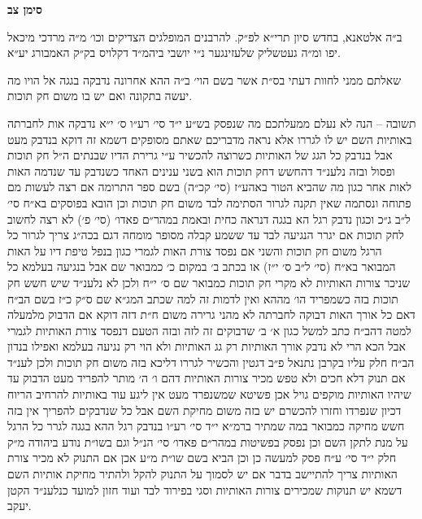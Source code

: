 \documentclass[12pt, openany]{book}
\newcommand{\chapname}{}
\newcommand{\newchap}[1]{
	\addcontentsline{toc}{chapter}{#1}
	\renewcommand{\chapname}{#1}
		\begin{center}
			\textbf{%
\fontsize{16pt}{16pt}\selectfont
				#1}
		\end{center}
}
\begin{document}
\newchap{סימן צב}
\begin{multicols}{2}
ב״ה אלטאנא, בחדש סיון תרי״א לפ״ק. להרבנים המופלגים הצדיקים וכו׳ מ״ה מרדכי מיכאל יפו ומ״ה געטשליק שלעזינגער נ״י יושבי ביהמ״ד דקלויס בק״ק האמבורג יע״א.\\\vspace{0pt}

שאלתם ממני לחוות דעתי בס״ת אשר בשם הוי׳ ב״ה ההא אחרונה נדבקה בגגה אל הויו מה יעשה בתקונה ואם יש בו משום חק תוכות.\\\vspace{0pt}

תשובה – הנה לא נעלם ממעלתכם מה שנפסק בש״ע י״ד סי׳ רע״ו ס׳ י״א נדבקה אות לחברתה באותיות השם יש לו לגררו אלא נראה מדבריכם שאתם מסופקים דשמא זה דוקא בנדבק מעט אבל בנדבק כל הגג של האותיות כשרוצה להכשיר ע״י גרירת הדיו שבנתים ה״ל חק תוכות ופסול ובזה נלענ״ד דהחשש דחק תוכות הוא בשני ענינים האחד כשנדבק עד שנדמה האות לאות אחר כגון מה שהביא הטור באהע״ז (סי׳ קכ״ה) בשם ספר התרומה אם רצה לעשות מם פתוחה ונסתמה שאין תקנה לגרור הסתימה לבד משום חק תוכות וכן הובא בפוסקים בא״ח סי׳ ל״ב ג״כ וכגון נדבק רגל הא בגגה דנראה כחית ובאמת במהר״ם פאדו׳ (סי׳ פ׳) לא רצה לחשוב לחק תוכות אם יגרר הנגיעה לבד עד ששמע קבלה מסופר מומחה דגם בכה״ג צריך לגרור כל הרגל משום חק תוכות והשני אם נפסד צורת האות לגמרי כגון בנפל טיפת דיו על האות המבואר בא״ח (סי׳ ל״ב ס׳ י״ז) או בכתב ב׳ במקום כ׳ כמבואר שם אבל בנגיעה בעלמא כל שניכר צורות האותיות לא מקרי חק תוכות כמבואר שם ס׳ י״ח ולכן לא נלענ״ד שיש חשש חק תוכות בזה כשמפריד הו׳ מההא ואין לדמות זה למה שכתב המג״א שם ס״ק כ״ז בשם הב״ח דאם כל אורך האות דבוקה לחברתה לא מהני גרירה משום ח״ת דזה דוקא אם הדבוק מלמעלה למטה דהב״ח כתב למשל כגון א׳ ב׳ שדבוקים זה לזה ובזה הטעם דנפסד צורת האותיות לגמרי אבל הכא הרי לא נדבק אורך האותיות רק גג האותיות ולא הוי רק נגיעה בעלמא ואפילו בנדון הב״ח חלק עליו בקרבן נתנאל פ״ב דגטין והכשיר לגררו דליכא בזה משום חק תוכות ולכן לענ״ד אם תנוק דלא חכים ולא טפש מכיר צורות האותיות דהם ו׳ ה׳ מותר להפריד מעט הדבוק עד שיהיו האותיות מוקפים גויל אכן פשיטא שמשנפרד מעט אין ליגע עוד באותיות להרחיב הריוח דכיון שנפרדו וחזרו להכשרם יש בזה משום מחיקת השם אבל כל שנדבקים להפריך אין בזה חשש מחיקה כמבואר במה שמתיר ברמ״א י״ד סי׳ רע״ו בנדבק רגל ההא בגגה לגרר כל הרגל על מנת לתקן השם וכן נפסק בפשיטות במהר״ם פאדו׳ סי׳ הנ״ל וגם בשו״ת נודע ביהודה מ״ק חלק י״ד סי׳ ע״ח פסק למעשה כן וכן הביא בשם שו״ת מ״ע אכן אם התנוק לא מכיר צורת האותיות צריך להתיישב בדבר אם יש לסמוך על התנוק להקל ולהתיר מחיקת אותיות השם דשמא יש תנוקות שמכירים צורות האותיות וסגי בפירוד לבד ועוד חזון למועד כנלענ״ד הקטן יעקב.\\\vspace{0pt}

\end{multicols}\newpage
\end{document}
